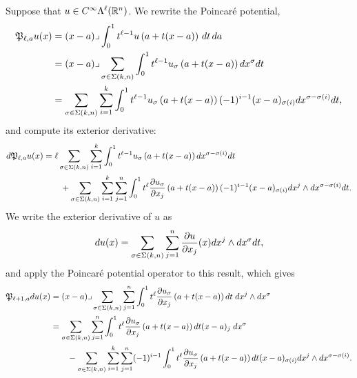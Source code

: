 \documentclass[12pt,a4paper]{article}
\begin{document}
Suppose that $u \in C^{\infty}\Lambda^{\ell}({\mathbb R}^n)$.
We rewrite the Poincar\'e potential,
\begin{align*}
    {\mathfrak P}_{\ell,a} u(x) 
    &= 
    (x-a)\lrcorner \int_{0}^{1} t^{\ell-1} u\left(a+t(x-a)\right)\,dt\,da\;
    \\&
    = 
    (x-a)\lrcorner 
    \sum_{\sigma \in \Sigma(k,n)}
    \int_{0}^{1} 
    t^{\ell-1} u_{\sigma}\left(a+t(x-a)\right) dx^{\sigma} dt 
    \\&
    = 
    \sum_{\sigma \in \Sigma(k,n)} \sum_{i=1}^{k}
    \int_{0}^{1} 
    t^{\ell-1} u_{\sigma}\left(a+t(x-a)\right) (-1)^{i-1} (x-a)_{\sigma(i) } dx^{\sigma-\sigma(i)} dt 
    ,
\end{align*}
and compute its exterior derivative:
\begin{align*}
    d {\mathfrak P}_{\ell,a} u(x) 
    &= 
    \ell
    \sum_{\sigma \in \Sigma(k,n)} \sum_{i=1}^{k}
    \int_{0}^{1} 
    t^{\ell-1} u_{\sigma}\left(a+t(x-a)\right) dx^{\sigma-\sigma(i)} dt 
    \\&\qquad
    + 
    \sum_{\sigma \in \Sigma(k,n)} \sum_{i=1}^{k} \sum_{j=1}^{n}
    \int_{0}^{1} 
    t^{\ell} \frac{ \partial u_{\sigma} }{\partial x_{j}}\left(a+t(x-a)\right) (-1)^{i-1} (x-a)_{\sigma(i) } dx^{j} \wedge dx^{\sigma-\sigma(i)} dt 
    .
\end{align*}
We write the exterior derivative of $u$ as 
\begin{align*}
    d u(x)
    =
    \sum_{\sigma \in \Sigma(k,n)} \sum_{j=1}^{n}
    \frac{ \partial u }{\partial x_{j}}(x) dx^{j} \wedge dx^{\sigma} dt 
    ,
\end{align*}
and apply the Poincar\'e potential operator to this result, which gives 
\begin{align*}
    {\mathfrak P}_{\ell+1,a} d u(x)
    &=
    (x-a)\lrcorner 
    \sum_{\sigma \in \Sigma(k,n)} \sum_{j=1}^{n}
    \int_{0}^{1} t^{\ell} \frac{ \partial u_{\sigma} }{\partial x_{j}}\left(a+t(x-a)\right) dt 
    \;dx^{j} \wedge dx^{\sigma}
    \\&
    = 
    \sum_{\sigma \in \Sigma(k,n)} \sum_{j=1}^{n}
    \int_{0}^{1} t^{\ell} \frac{ \partial u_{\sigma} }{\partial x_{j}}\left(a+t(x-a)\right) dt (x-a)_{j}
    \;dx^{\sigma}
    \\&\qquad 
    - 
    \sum_{\sigma \in \Sigma(k,n)} \sum_{i=1}^{k} \sum_{j=1}^{n}
    (-1)^{i-1}
    \int_{0}^{1} t^{\ell} \frac{ \partial u_{\sigma} }{\partial x_{j}}\left(a+t(x-a)\right) dt 
    (x-a)_{\sigma(i)} dx^{j} \wedge dx^{\sigma-\sigma(i)}
    .
\end{align*}
\end{document}

